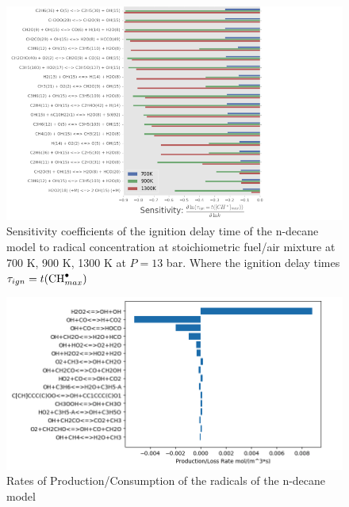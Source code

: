 \begin{figure}
    \centering
    \includegraphics[scale=0.5, keepaspectratio]{images/sensitivity-nc10.png}
    \caption{Sensitivity coefficients of the ignition delay time of the n-decane model to  radical concentration at stoichiometric fuel/air mixture at 700 K, 900 K, 1300 K at $P=13$ bar. Where the ignition delay times $\tau_{ign}=t(\ce{CH^.}_{max})$}
    \label{fig:nc10-sensitivity}
\end{figure}


\begin{figure}
    \centering
    \includegraphics[scale=0.45, keepaspectratio]{images/ROP_nc10.png}
    \caption{Rates of Production/Consumption of the  radicals of the n-decane model}
    \label{fig:rop-nc10}
\end{figure}

\newpage

